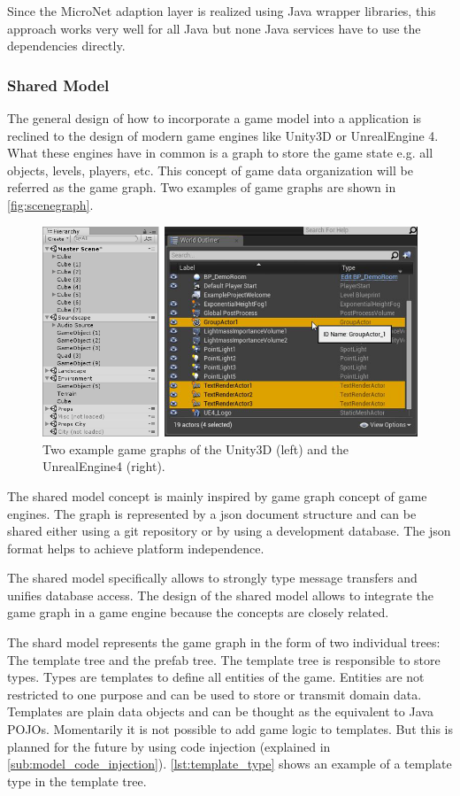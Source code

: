 Since the MicroNet adaption layer is realized using Java wrapper libraries,
this approach works very well for all Java \mss{} but none Java services have to
use the dependencies directly.

\subsubsection{Shared Model}
\label{subsub:shared_model}

The general design of how to incorporate a game model into a \mn{} application
is reclined to the design of modern game engines like Unity3D or UnrealEngine 4.
What these engines have in common is a graph to store the game state e.g. all
objects, levels, players, etc. This concept of game data organization will be
referred as the game graph. Two examples of game graphs are shown in
\autoref{fig:scenegraph}.

\begin{figure}
  \centering
  \includegraphics[width=\textwidth]{images/game_engine/scenegraph}
  \caption{Two example game graphs of the Unity3D (left) and the UnrealEngine4
  (right).}
  \label{fig:scenegraph}
\end{figure}

The shared model concept is mainly inspired by game graph concept of game
engines. The graph is represented by a \gls{json} document structure and can be shared
either using a git repository or by using a development database. The \gls{json}
format helps to achieve platform independence.

The shared model specifically allows to strongly type message transfers and
unifies database access. The design of the shared model allows to integrate the
game graph in a game engine because the concepts are closely related.

The shard model represents the game graph in the form of two individual trees:
The template tree and the prefab tree. The template tree is responsible to store
types. Types are templates to define all entities of the game. Entities are not
restricted to one purpose and can be used to store or transmit domain data.
Templates are plain data objects and can be thought as the equivalent to Java
POJOs. Momentarily it is not possible to add game logic to templates. But this
is planned for the future by using code injection (explained in
\autoref{sub:model_code_injection}). \autoref{lst:template_type} shows an
example of a template type in the template tree.

